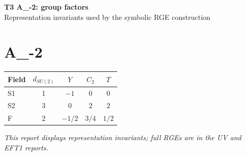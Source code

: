 \documentclass[10pt,a4paper]{article}
\begin{document}
\begin{center}
{\Large\bfseries T3 A\_-2: group factors}\\[4pt]
Representation invariants used by the symbolic RGE construction
\end{center}
\bigskip
\section*{A\_-2}
\begin{longtable}{@{}lcccc@{}}
\toprule Field & $d_{SU(2)}$ & $Y$ & $C_2$ & $T$ \\
\midrule
S1 & 1 & $-1$ & $0$ & $0$ \\
S2 & 3 & $0$ & $2$ & $2$ \\
F & 2 & $-1/2$ & $3/4$ & $1/2$ \\
\bottomrule
\end{longtable}
\emph{This report displays representation invariants; full RGEs are in the UV and EFT1 reports.}
\end{document}
